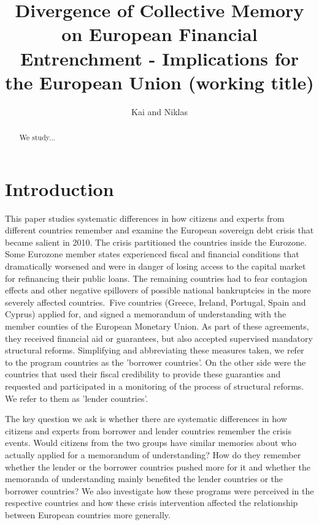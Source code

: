 \documentclass[12pt]{article}
\begin{document}
\title{Divergence of Collective Memory on European Financial Entrenchment -
Implications for the European Union (working title)}
\author{Kai and Niklas}
\maketitle

\begin{abstract}
We study...
\end{abstract}
\clearpage
\section{Introduction}
This paper studies systematic differences in how citizens and experts from
different countries remember and examine the European sovereign debt crisis
that became salient in 2010. The crisis partitioned the countries inside the
Eurozone. Some Eurozone member states experienced fiscal and financial
conditions that dramatically worsened and were in danger of losing access to
the capital market for refinancing their public loans. The remaining
countries had to fear contagion effects and other negative spillovers of
possible national bankruptcies in the more severely affected countries.\
Five countries (Greece, Ireland, Portugal, Spain and Cyprus) applied for,
and signed a memorandum of understanding with the member counties of the
European Monetary Union. As part of these agreements, they received
financial aid or guarantees, but also accepted supervised mandatory
structural reforms. Simplifying and abbreviating these measures taken, we
refer to the program countries as the 'borrower countries'. On the other
side were the countries that used their fiscal credibility to provide these
guaranties and requested and participated in a monitoring of the process of
structural reforms. We refer to them as 'lender countries'.

The key question we ask is whether there are systematic differences in how
citizens and experts from borrower and lender countries remember the crisis
events. Would citizens from the two groups have similar memories about who
actually applied for a memorandum of understanding? How do they remember
whether the lender or the borrower countries pushed more for it and whether
the memoranda of understanding mainly benefited the lender countries or the
borrower countries? We also investigate how these programs were perceived in the
respective countries and how these crisis intervention affected the
relationship between European countries more generally.\ 
\end{document}
